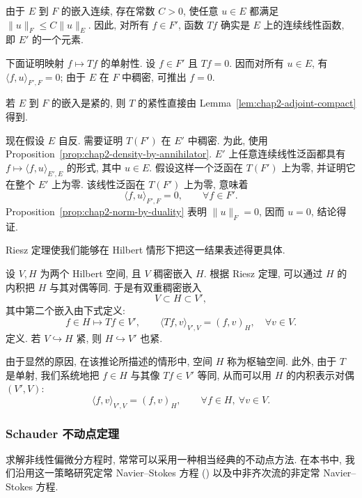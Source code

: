 \begin{Proof}
由于 $E$ 到 $F$ 的嵌入连续, 存在常数 $C>0$, 使任意 $u\in E$ 都满足 $\|u\|_F\leq C\|u\|_E$. 因此, 对所有 $f\in F'$, 函数 $Tf$ 确实是 $E$ 上的连续线性函数, 即 $E'$ 的一个元素.

下面证明映射 $f\mapsto Tf$ 的单射性. 设 $f\in F'$ 且 $Tf=0$. 因而对所有 $u\in E$, 有 $\langle f,u\rangle_{F',F}=0$; 由于 $E$ 在 $F$ 中稠密, 可推出 $f=0$.

若 $E$ 到 $F$ 的嵌入是紧的, 则 $T$ 的紧性直接由 Lemma~\ref{lem:chap2-adjoint-compact} 得到.

现在假设 $E$ 自反. 需要证明 $T(F')$ 在 $E'$ 中稠密. 为此, 使用 Proposition~\ref{prop:chap2-density-by-annihilator}. $E'$ 上任意连续线性泛函都具有 $f\mapsto\langle f,u\rangle_{E',E}$ 的形式, 其中 $u\in E$. 假设这样一个泛函在 $T(F')$ 上为零, 并证明它在整个 $E'$ 上为零. 该线性泛函在 $T(F')$ 上为零, 意味着
\[
 \langle f,u\rangle_{F',F}=0,
 \qquad\forall f\in F'.
\]
Proposition~\ref{prop:chap2-norm-by-duality} 表明 $\|u\|_F=0$, 因而 $u=0$, 结论得证.
\end{Proof}

Riesz 定理使我们能够在 Hilbert 情形下把这一结果表述得更具体.

\begin{Corollary}
\label{cor:chap2-pivot-space-compact-embedding}
设 $V,H$ 为两个 Hilbert 空间, 且 $V$ 稠密嵌入 $H$. 根据 Riesz 定理, 可以通过 $H$ 的内积把 $H$ 与其对偶等同. 于是有双重稠密嵌入
\[
 V\subset H\subset V',
\]
其中第二个嵌入由下式定义:
\[
 f\in H\longmapsto Tf\in V',
 \qquad \langle Tf,v\rangle_{V',V}=(f,v)_H,
 \quad\forall v\in V.
\]
定义. 若 $V\hookrightarrow H$ 紧, 则 $H\hookrightarrow V'$ 也紧.
\end{Corollary}

由于显然的原因, 在该推论所描述的情形中, 空间 $H$ 称为枢轴空间. 此外, 由于 $T$ 是单射, 我们系统地把 $f\in H$ 与其像 $Tf\in V'$ 等同, 从而可以用 $H$ 的内积表示对偶 $(V',V)$:
\[
 \langle f,v\rangle_{V',V}=(f,v)_H,
 \qquad\forall f\in H,\ \forall v\in V.
\]

\subsubsection{Schauder 不动点定理}
\label{subsec:chap2-schauder-fixed-point}

求解非线性偏微分方程时, 常常可以采用一种相当经典的不动点方法. 在本书中, 我们沿用这一策略研究定常 Navier--Stokes 方程 () 以及中非齐次流的非定常 Navier--Stokes 方程.

